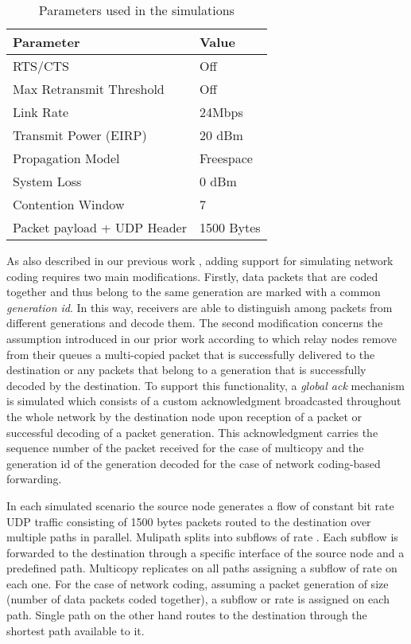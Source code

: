 \documentclass[journal, onecolumn, 12pt]{IEEEtran}
\begin{document}
\begin{table}[t]
\caption{Parameters used in the simulations}
\label{tab:param_simul}
\begin{center}
\begin{tabular}{ll}
\hline
Parameter & Value\\ \hline
RTS/CTS & Off\\
Max Retransmit Threshold & Off\\
Link Rate & 24Mbps\\
Transmit Power (EIRP) & 20 dBm\\
Propagation Model & Freespace\\
System Loss & 0 dBm\\
Contention Window & 7\\
Packet payload + UDP Header & 1500 Bytes\\
\hline
\end{tabular}
\end{center}
\end{table}

As also described in our previous work \cite{6335387}, adding support for simulating network coding requires two main modifications. Firstly, data packets that are coded together
and thus belong to the same generation are marked with a common \textit{generation id}. In this way, receivers are able
to distinguish among packets from different generations and decode them.
The second modification concerns the assumption introduced in our prior work \cite{ref:papas_hop_by_hop} according to which relay nodes remove from their queues a multi-copied packet that is successfully delivered to the destination or any
packets that belong to a generation that is successfully decoded by the destination. To support this functionality,
a \textit{global ack} mechanism is simulated which consists of a custom acknowledgment broadcasted throughout the whole network by the destination node upon
reception of a packet or successful decoding
of a packet generation.
This acknowledgment carries the sequence number of the packet received for the case of multicopy and the generation id of
the generation decoded for the case of network coding-based forwarding.

In each simulated scenario the source node generates a flow  of  constant bit rate UDP traffic consisting of 1500 bytes packets routed to the destination over  multiple paths in parallel.
Mulipath splits  into  subflows of rate .
Each subflow is forwarded to the destination through a specific interface of the source node and a predefined path.
Multicopy replicates  on all paths assigning a subflow of rate  on each one.
For the case of network coding, assuming a packet generation of size  (number of data packets coded together), a subflow or rate  is assigned on each path.
Single path on the other hand routes  to the destination through the shortest path available to it.
\end{document}
